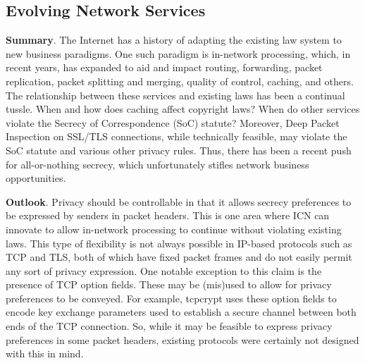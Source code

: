 \subsection{Evolving Network Services}
{\bf Summary}. The Internet has a history of adapting the existing law system to new business paradigms.
One such paradigm is in-network processing, which, in recent years, has expanded to
aid and impact routing, forwarding, packet replication, packet splitting and merging,
quality of control, caching, and others. The relationship between these services and
existing laws has been a continual tussle. When and how does caching affect copyright laws?
When do other services violate the Secrecy of Correspondence (SoC) statute?
Moreover, Deep Packet Inspection on SSL/TLS connections, while technically feasible, may violate
the SoC statute and various other privacy rules. Thus, there has been a recent push for
all-or-nothing secrecy, which unfortunately stifles network business opportunities.

{\bf Outlook}. Privacy should be controllable in that it allows secrecy preferences to be
expressed by senders in packet headers. This is one area where ICN can innovate to
allow in-network processing to continue without violating existing laws. This type
of flexibility is not always possible in IP-based protocols such as TCP and TLS, both
of which have fixed packet frames and do not easily permit any sort of privacy expression.
One notable exception to this claim is the presence of TCP option fields. These may
be (mis)used to allow for privacy preferences to be conveyed. For example, tcpcrypt \cite{ietf-tcpinc-tcpcrypt-03}
uses these option fields to encode key exchange parameters used to establish
a secure channel between both ends of the TCP connection. So, while it may be feasible
to express privacy preferences in some packet headers, existing protocols were certainly
not designed with this in mind.
